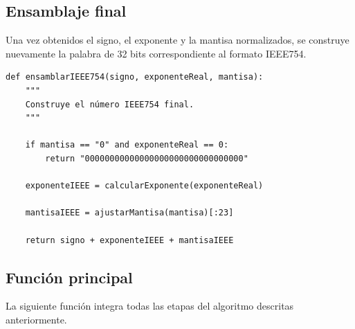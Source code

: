 \documentclass[11pt]{article}
\begin{document}
\subsection{Ensamblaje final}
\label{sec:orgeaca001}

Una vez obtenidos el signo, el exponente y la mantisa normalizados,
se construye nuevamente la palabra de 32 bits correspondiente al
formato IEEE754.

\begin{verbatim}
def ensamblarIEEE754(signo, exponenteReal, mantisa):
    """
    Construye el número IEEE754 final.
    """

    if mantisa == "0" and exponenteReal == 0:
        return "00000000000000000000000000000000"

    exponenteIEEE = calcularExponente(exponenteReal)

    mantisaIEEE = ajustarMantisa(mantisa)[:23]

    return signo + exponenteIEEE + mantisaIEEE
\end{verbatim}
\subsection{Función principal}
\label{sec:org91b07b9}

La siguiente función integra todas las etapas del algoritmo descritas
anteriormente.
\end{document}
